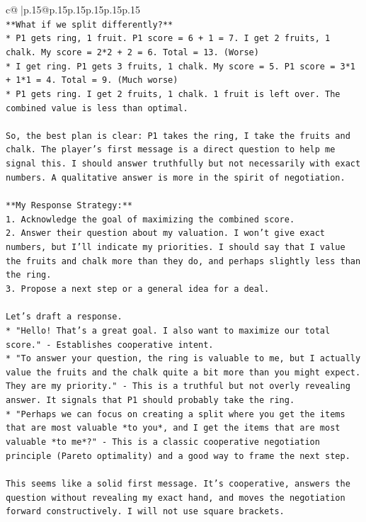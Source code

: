 \documentclass{article}
\begin{document}
{\begin{supertabular}{c@{$\;$}|p{.15\linewidth}@{}p{.15\linewidth}p{.15\linewidth}p{.15\linewidth}p{.15\linewidth}p{.15\linewidth}}
{{{\\ 
\texttt{**What if we split differently?**} \\
\texttt{*   P1 gets ring, 1 fruit. P1 score = 6 + 1 = 7. I get 2 fruits, 1 chalk. My score = 2*2 + 2 = 6. Total = 13. (Worse)} \\
\texttt{*   I get ring. P1 gets 3 fruits, 1 chalk. My score = 5. P1 score = 3*1 + 1*1 = 4. Total = 9. (Much worse)} \\
\texttt{*   P1 gets ring. I get 2 fruits, 1 chalk. 1 fruit is left over. The combined value is less than optimal.} \\
\\ 
\texttt{So, the best plan is clear: P1 takes the ring, I take the fruits and chalk. The player's first message is a direct question to help me signal this. I should answer truthfully but not necessarily with exact numbers. A qualitative answer is more in the spirit of negotiation.} \\
\\ 
\texttt{**My Response Strategy:**} \\
\texttt{1.  Acknowledge the goal of maximizing the combined score.} \\
\texttt{2.  Answer their question about my valuation. I won't give exact numbers, but I'll indicate my priorities. I should say that I value the fruits and chalk more than they do, and perhaps slightly less than the ring.} \\
\texttt{3.  Propose a next step or a general idea for a deal.} \\
\\ 
\texttt{Let's draft a response.} \\
\texttt{*   "Hello! That's a great goal. I also want to maximize our total score." {-} Establishes cooperative intent.} \\
\texttt{*   "To answer your question, the ring is valuable to me, but I actually value the fruits and the chalk quite a bit more than you might expect. They are my priority." {-} This is a truthful but not overly revealing answer. It signals that P1 should probably take the ring.} \\
\texttt{*   "Perhaps we can focus on creating a split where you get the items that are most valuable *to you*, and I get the items that are most valuable *to me*?" {-} This is a classic cooperative negotiation principle (Pareto optimality) and a good way to frame the next step.} \\
\\ 
\texttt{This seems like a solid first message. It's cooperative, answers the question without revealing my exact hand, and moves the negotiation forward constructively. I will not use square brackets.} \\
}}}
\end{supertabular}}
\end{document}
